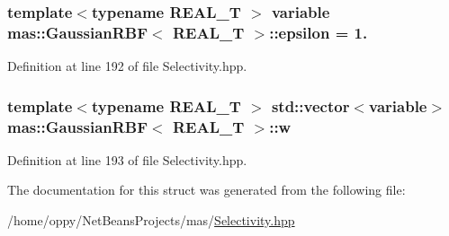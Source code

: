 \hypertarget{structmas_1_1_gaussian_r_b_f_a77f2e2c11d1166255d43e81853bc21a3}{
\subsubsection[{epsilon}]{\setlength{\rightskip}{0pt plus 5cm}template$<$typename R\-E\-A\-L\-\_\-\-T $>$ {\bf variable} {\bf mas\-::\-Gaussian\-R\-B\-F}$<$ R\-E\-A\-L\-\_\-\-T $>$\-::epsilon = 1.}}\label{structmas_1_1_gaussian_r_b_f_a77f2e2c11d1166255d43e81853bc21a3}


Definition at line 192 of file Selectivity.\-hpp.

\hypertarget{structmas_1_1_gaussian_r_b_f_a47643c5b8933dfaa3c501effbf190639}{
\subsubsection[{w}]{\setlength{\rightskip}{0pt plus 5cm}template$<$typename R\-E\-A\-L\-\_\-\-T $>$ std\-::vector$<${\bf variable}$>$ {\bf mas\-::\-Gaussian\-R\-B\-F}$<$ R\-E\-A\-L\-\_\-\-T $>$\-::w}}\label{structmas_1_1_gaussian_r_b_f_a47643c5b8933dfaa3c501effbf190639}


Definition at line 193 of file Selectivity.\-hpp.



The documentation for this struct was generated from the following file\-:\begin{DoxyCompactItemize}
\item 
/home/oppy/\-Net\-Beans\-Projects/mas/\hyperlink{_selectivity_8hpp}{Selectivity.\-hpp}\end{DoxyCompactItemize}
